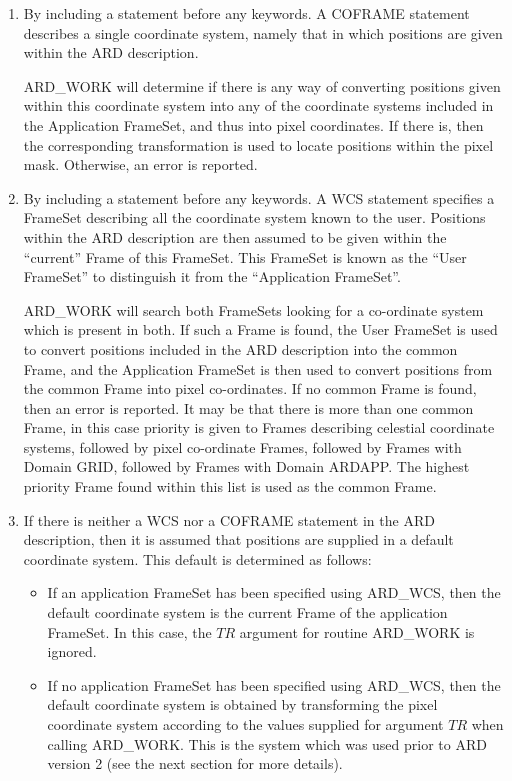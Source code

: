 \begin{enumerate}
\item By including a  statement before any
keywords. A COFRAME statement describes a single coordinate system,
namely that in which positions are given within the ARD description.

ARD\_WORK will determine if there is any way of converting positions
given within this coordinate system into any of the coordinate systems
included in the Application FrameSet, and thus into pixel coordinates.
If there is, then the corresponding transformation is used to locate
positions within the pixel mask. Otherwise, an error is reported.

\item By including a  statement before any
keywords. A WCS statement specifies a FrameSet describing all the
coordinate system known to the user. Positions within the ARD description
are then assumed to be given within the ``current'' Frame of this
FrameSet. This FrameSet is known as the ``User FrameSet'' to distinguish
it from the ``Application FrameSet''.

ARD\_WORK will search both FrameSets looking for a co-ordinate system
which is present in both. If such a Frame is found, the User FrameSet is
used to convert positions included in the ARD description into the common
Frame, and the Application FrameSet is then used to convert positions
from the common Frame into pixel co-ordinates. If no common Frame is
found, then an error is reported. It may be that there is more than one
common Frame, in this case priority is given to Frames describing
celestial coordinate systems, followed by pixel co-ordinate Frames,
followed by Frames with Domain GRID, followed by Frames with Domain
ARDAPP. The highest priority Frame found within this list is used as the
common Frame.

\item If there is neither a WCS nor a COFRAME statement in the ARD
description, then it is assumed that positions are supplied in a default
coordinate system. This default is determined as follows:

\begin{itemize}
\item If an application FrameSet has been specified using ARD\_WCS, then 
the default coordinate system is the current Frame of the application 
FrameSet. In this case, the $TR$ argument for routine ARD\_WORK is ignored.

\item If no application FrameSet has been specified using ARD\_WCS, then 
the default coordinate system is obtained by transforming the pixel
coordinate system according to the values supplied for argument $TR$ when
calling ARD\_WORK. This is the system which was used prior to ARD version
2 (see the next section for more details).
\end{itemize}


\end{enumerate}
